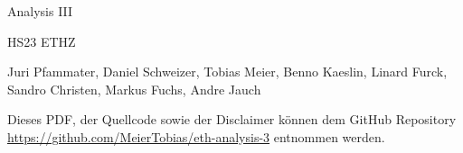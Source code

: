 \documentclass[a4paper,10pt,landscape]{scrartcl}
\begin{document}
\begin{multicols*}{3}
%
\begin{center}
    \huge{Analysis III \par}
    \vspace{0.1cm}
    \large{HS23 ETHZ\par}
    \vspace{0.3cm}
    \normalsize{Juri Pfammater, Daniel Schweizer, Tobias Meier, Benno Kaeslin, Linard Furck, Sandro Christen, Markus Fuchs, Andre Jauch}
    \vspace{0.3cm}
\end{center}    
Dieses PDF, der Quellcode sowie der Disclaimer können dem GitHub Repository \url{https://github.com/MeierTobias/eth-analysis-3} entnommen werden.
\vspace{0.2cm}



\vfill\null %
\columnbreak
%

%  
\end{multicols*}
%
\end{document}
